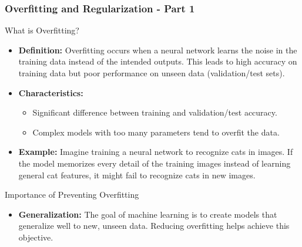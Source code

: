 \documentclass{beamer}
\begin{document}
\begin{frame}[fragile]
    \frametitle{Overfitting and Regularization - Part 1}
    \begin{block}{What is Overfitting?}
        \begin{itemize}
            \item \textbf{Definition:} Overfitting occurs when a neural network learns the noise in the training data instead of the intended outputs. This leads to high accuracy on training data but poor performance on unseen data (validation/test sets).
            \item \textbf{Characteristics:}
            \begin{itemize}
                \item Significant difference between training and validation/test accuracy.
                \item Complex models with too many parameters tend to overfit the data.
            \end{itemize}
            \item \textbf{Example:} Imagine training a neural network to recognize cats in images. If the model memorizes every detail of the training images instead of learning general cat features, it might fail to recognize cats in new images.
        \end{itemize}
    \end{block}

    \begin{block}{Importance of Preventing Overfitting}
        \begin{itemize}
            \item \textbf{Generalization:} The goal of machine learning is to create models that generalize well to new, unseen data. Reducing overfitting helps achieve this objective.
        \end{itemize}
    \end{block}
\end{frame}
\end{document}
